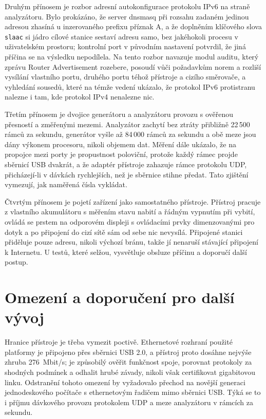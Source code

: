 Druhým přínosem je rozbor adresní autokonfigurace protokolu IPv6 na straně analyzátoru. Bylo prokázáno, že server dnsmasq při rozsahu zadaném jedinou adresou zhasíná u inzerovaného prefixu příznak A, a že doplněním klíčového slova \texttt{slaac} si jádro cílové stanice sestaví adresu samo, bez jakéhokoli procesu v uživatelském prostoru; kontrolní port v původním nastavení potvrdil, že jiná příčina se na výsledku nepodílela. Na tento rozbor navazuje modul auditu, který zprávu Router Advertisement rozebere, posoudí vůči požadavkům norem a rozliší vysílání vlastního portu, druhého portu téhož přístroje a cizího směrovače, a vyhledání sousedů, které na témže vedení ukázalo, že protokol IPv6 protistranu nalezne i tam, kde protokol IPv4 nenalezne nic.

Třetím přínosem je dvojice generátoru a analyzátoru provozu s ověřenou přesností a změřenými mezemi. Analyzátor zachytí bez ztráty přibližně 22\,500 rámců za sekundu, generátor vyšle až 84\,000 rámců za sekundu a obě meze jsou dány výkonem procesoru, nikoli objemem dat. Měření dále ukázalo, že na propojce mezi porty je propustnost poloviční, protože každý rámec projde sběrnicí USB dvakrát, a že adaptér přístroje zahazuje rámce protokolu UDP, přicházejí-li v dávkách rychlejších, než je sběrnice stihne předat. Tato zjištění vymezují, jak naměřená čísla vykládat.

Čtvrtým přínosem je pojetí zařízení jako samostatného přístroje. Přístroj pracuje z vlastního akumulátoru s měřením stavu nabití a řádným vypnutím při vybití, ovládá se prstem na odporovém displeji s ovládacími prvky dimenzovanými pro dotyk a po připojení do cizí sítě sám od sebe nic nevysílá. Připojené stanici přiděluje pouze adresu, nikoli výchozí bránu, takže jí nenaruší stávající připojení k Internetu. U testů, které selžou, vysvětluje obsluze příčinu a doporučí další postup.

\section*{Omezení a doporučení pro další vývoj}

Hranice přístroje je třeba vymezit poctivě. Ethernetové rozhraní použité platformy je připojeno přes sběrnici USB 2.0, a přístroj proto dosáhne nejvýše zhruba 276~Mbit/s; je způsobilý ověřit funkčnost spoje, porovnat protokoly za shodných podmínek a odhalit hrubé závady, nikoli však certifikovat gigabitovou linku. Odstranění tohoto omezení by vyžadovalo přechod na novější generaci jednodeskového počítače s ethernetovým řadičem mimo sběrnici USB. Týká se to i příjmu dávkového provozu protokolem UDP a meze analyzátoru v rámcích za sekundu.

